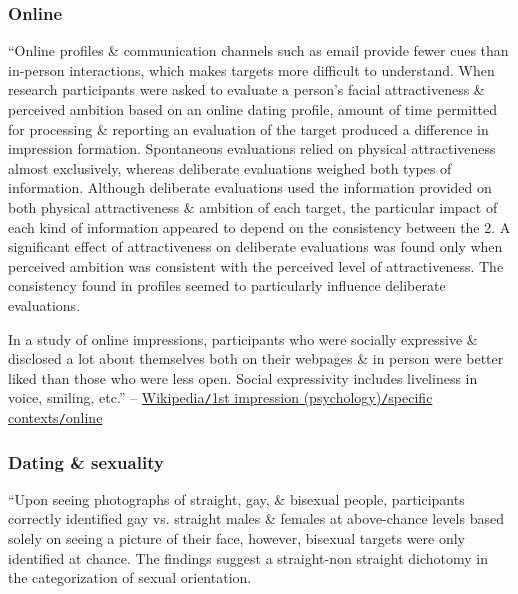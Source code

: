 \documentclass[oneside]{book}
\numberwithin{equation}{section}
\begin{document}
\subsubsection{Online}
``Online profiles \& communication channels such as email provide fewer cues than in-person interactions, which makes targets more difficult to understand. When research participants were asked to evaluate a person's facial attractiveness \& perceived ambition based on an online dating profile, amount of time permitted for processing \& reporting an evaluation of the target produced a difference in impression formation. Spontaneous evaluations relied on physical attractiveness almost exclusively, whereas deliberate evaluations weighed both types of information. Although deliberate evaluations used the information provided on both physical attractiveness \& ambition of each target, the particular impact of each kind of information appeared to depend on the consistency between the 2. A significant effect of attractiveness on deliberate evaluations was found only when perceived ambition was consistent with the perceived level of attractiveness. The consistency found in profiles seemed to particularly influence deliberate evaluations.

In a study of online impressions, participants who were socially expressive \& disclosed a lot about themselves both on their webpages \& in person were better liked than those who were less open. Social expressivity includes liveliness in voice, smiling, etc.'' -- \href{https://en.wikipedia.org/wiki/First_impression_(psychology)#Online}{Wikipedia\texttt{/}1st impression (psychology)\texttt{/}specific contexts\texttt{/}online}

\subsubsection{Dating \& sexuality}
``Upon seeing photographs of straight, gay, \& bisexual people, participants correctly identified gay vs. straight males \& females at above-chance levels based solely on seeing a picture of their face, however, bisexual targets were only identified at chance. The findings suggest a straight-non straight dichotomy in the categorization of sexual orientation.
\end{document}
